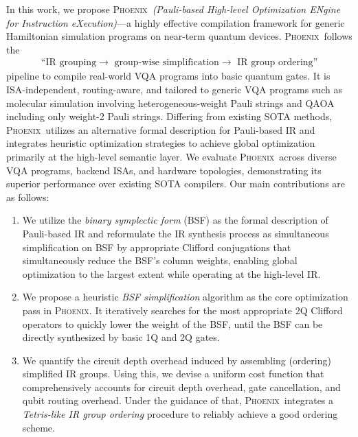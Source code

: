 \documentclass[conference,9pt]{IEEEtran}
\newcommand{\dquote}[1]{``#1''}
\newcommand{\phoenix}{\textsc{Phoenix}}
\begin{document}
    In this work, we propose \phoenix\ \emph{(Pauli-based High-level Optimization ENgine for Instruction eXecution)}---a highly effective compilation framework for generic Hamiltonian simulation programs on near-term quantum devices. \phoenix\ follows the 
    \begin{align*}
        \text{\dquote{IR grouping$\to$ group-wise simplification$\to$ IR group ordering}}
    \end{align*}
    pipeline to compile real-world VQA programs into basic quantum gates. It is ISA-independent, routing-aware, and tailored to generic VQA programs such as molecular simulation involving heterogeneous-weight Pauli strings and QAOA including only weight-2 Pauli strings. Differing from existing SOTA methods, \phoenix\ utilizes an alternative formal description for Pauli-based IR and integrates heuristic optimization strategies to achieve global optimization primarily at the high-level semantic layer. We evaluate \phoenix\ across diverse VQA programs, backend ISAs, and hardware topologies, demonstrating its superior performance over existing SOTA compilers. Our main contributions are as follows:
    \begin{enumerate}
        \item We utilize the \emph{binary symplectic form} (BSF) as the formal description of Pauli-based IR and reformulate the IR synthesis process as simultaneous simplification on BSF by appropriate Clifford conjugations that simultaneously reduce the BSF's column weights, enabling global optimization to the largest extent while operating at the high-level IR.
        \item We propose a heuristic \textit{BSF simplification} algorithm as the core optimization pass in \phoenix. It iteratively searches for the most appropriate 2Q Clifford operators to quickly lower the weight of the BSF, until the BSF can be directly synthesized by basic 1Q and 2Q gates.
        \item We quantify the circuit depth overhead induced by assembling (ordering) simplified IR groups. Using this, we devise a uniform cost function that comprehensively accounts for circuit depth overhead, gate cancellation, and qubit routing overhead. Under the guidance of that, \phoenix\ integrates a \emph{Tetris-like IR group ordering} procedure to reliably achieve a good ordering scheme.
    \end{enumerate}
\end{document}
